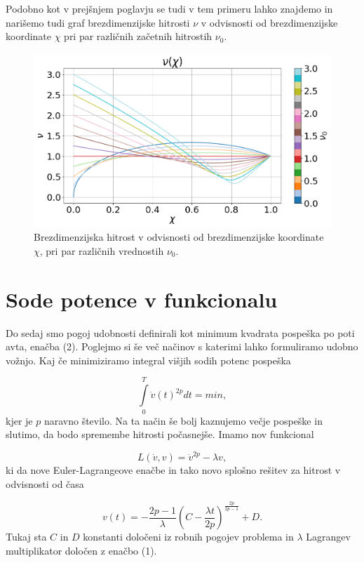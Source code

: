 \documentclass[slovene,11pt,a4paper]{article}
\begin{document}
Podobno kot v prejšnjem poglavju se tudi v tem primeru lahko znajdemo in narišemo tudi graf brezdimenzijske hitrosti $\nu$ v odvisnosti od brezdimenzijske koordinate $\chi$ pri par različnih začetnih hitrostih $\nu_0$.

\begin{figure}[h!]
\centering
\includegraphics[width=\linewidth]{Radar3.png}
\caption{Brezdimenzijska hitrost v odvisnosti od brezdimenzijske koordinate $\chi$, pri par različnih vrednostih $\nu_0$.}
\end{figure}

\section{Sode potence v funkcionalu}

Do sedaj smo pogoj udobnosti definirali kot minimum kvadrata pospeška po poti avta, enačba (2). Poglejmo si še več načinov s katerimi lahko formuliramo udobno vožnjo. Kaj če minimiziramo integral višjih sodih potenc pospeška

\begin{equation}
\int\limits_{0}^{T} \dot{v}(t)^{2p} dt = min,
\end{equation}
kjer je $p$ naravno število. Na ta način še bolj kaznujemo večje pospeške in slutimo, da bodo spremembe hitrosti počasnejše. Imamo nov funkcional

\begin{equation}
L(\dot{v}, v) = \dot{v}^{2p} - \lambda v,
\end{equation}
ki da nove Euler-Lagrangeove enačbe in tako novo splošno rešitev za hitrost v odvisnosti od časa

\begin{equation}
v(t) = - \frac{2p-1}{\lambda} \left(C-\frac{\lambda t}{2p}\right)^{\frac{2p}{2p-1}} + D.
\end{equation}
Tukaj sta $C$ in $D$ konstanti določeni iz robnih pogojev problema in $\lambda$ Lagrangev multiplikator določen z enačbo (1).
\end{document}
